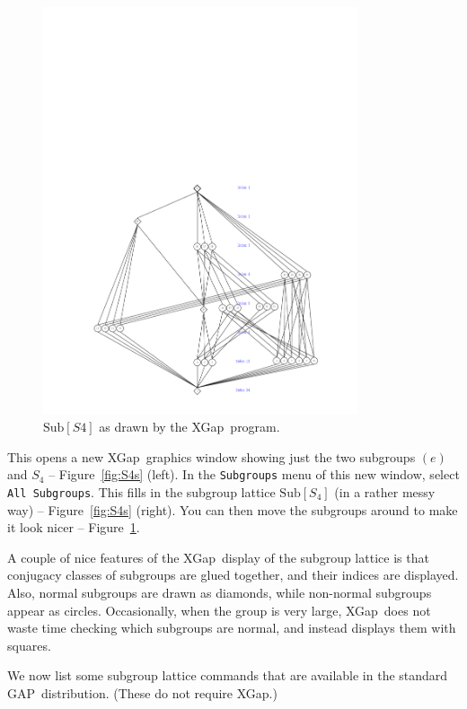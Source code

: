 \documentclass[11pt]{amsart}
\newcommand{\gap}{GAP}   %
\newcommand{\xgap}{XGap}   %
\theoremstyle{plain}
\newcommand{\<}{\ensuremath{\langle}}
\renewcommand{\>}{\ensuremath{\rangle}}
\newcommand{\Sub}{\ensuremath{\mathrm{Sub}}}
\begin{document}
\begin{figure}[!h]
  \begin{center}
    \vspace{-4cm}
    \includegraphics[height=12cm]{neatS4.pdf}%
    \caption{$\Sub[S4]$ as drawn by the \xgap\ program.}
    \label{fig:neatS4}
  \end{center}
\end{figure}
This opens a new \xgap\ graphics window showing just the two subgroups $(e)$ and
$S_4$ -- Figure~\ref{fig:S4s} (left).  In
the {\tt Subgroups} menu of this new window, select {\tt All Subgroups}.  This
fills in the subgroup lattice $\Sub[S_4]$ (in a rather messy way) -- Figure~\ref{fig:S4s}
(right).  You can then move the subgroups around to make it look nicer --
Figure~\ref{fig:neatS4}. 

A couple of nice features of the \xgap\ display of the
subgroup lattice is that conjugacy classes of subgroups are glued together, and
their indices are displayed.  Also, normal subgroups are drawn as diamonds, while
non-normal subgroups appear as circles.  Occasionally, when the group is very
large, \xgap\ does not waste time checking which subgroups are normal, and
instead displays them with squares.

We now list some subgroup lattice commands that are available in the standard
\gap\ distribution.  (These do not require \xgap.)
\end{document}
